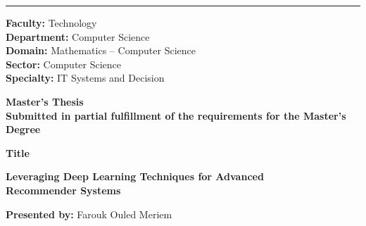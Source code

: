 \documentclass[12pt,a4paper]{report}
\begin{document}
\begin{titlepage}
\vspace{1pt}
\noindent\rule{\linewidth}{0.5pt}
\vspace{1pt}

\begin{flushleft}
  {\footnotesize \textbf{Faculty:} Technology}\\[0.5pt]
  {\footnotesize \textbf{Department:} Computer Science}\\[0.5pt]
  {\footnotesize \textbf{Domain:} Mathematics -- Computer Science}\\[0.5pt]
  {\footnotesize \textbf{Sector:} Computer Science}\\[0.5pt]
  {\footnotesize \textbf{Specialty:} IT Systems and Decision}
\end{flushleft}

\vspace{0.1cm}

\begin{center}
  {\large\bfseries Master’s Thesis}\\[1pt]
  {\normalsize \textbf{Submitted in partial fulfillment of the requirements for the Master's Degree}}
\end{center}

\vspace{0.05cm}
\begin{center}{\large\bfseries Title}\end{center}
\vspace{0.05cm}

\begin{mdframed}[
  linecolor=black, linewidth=1pt,
  innertopmargin=4pt, innerbottommargin=4pt,
  innerleftmargin=8pt, innerrightmargin=8pt,
  roundcorner=4pt
]
  \begin{center}
    {\bfseries
      Leveraging Deep Learning Techniques for Advanced\\[2pt]
      Recommender Systems
    }
  \end{center}
\end{mdframed}

\vspace{0.2cm}

\begin{center}
  \textbf{Presented by:} \quad Farouk Ouled Meriem
\end{center}


\end{titlepage}
\end{document}
